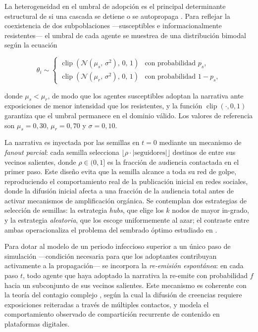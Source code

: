 \medskip

La heterogeneidad en el umbral de adopción es el principal determinante estructural de si una cascada se detiene o se autopropaga \cite{Granovetter1978, Watts2002}. Para reflejar la coexistencia de dos subpoblaciones ---susceptibles e informacionalmente resistentes--- el umbral de cada agente se muestrea de una distribución bimodal según la ecuación

\begin{equation}
  \label{eq:theta}
  \theta_i \sim
  \begin{cases}
    \operatorname{clip}\!\left(\mathcal{N}(\mu_s,\,\sigma^2),\,0,\,1\right) & \text{con probabilidad } p_s,\\[4pt]
    \operatorname{clip}\!\left(\mathcal{N}(\mu_r,\,\sigma^2),\,0,\,1\right) & \text{con probabilidad } 1 - p_s,
  \end{cases}
\end{equation}

\noindent donde $\mu_s < \mu_r$, de modo que los agentes susceptibles adoptan la narrativa ante exposiciones de menor intensidad que los resistentes, y la función $\operatorname{clip}(\cdot, 0, 1)$ garantiza que el umbral permanece en el dominio válido. Los valores de referencia son $\mu_s = 0{,}30$, $\mu_r = 0{,}70$ y $\sigma = 0{,}10$.

\medskip

La narrativa es inyectada por las semillas en $t = 0$ mediante un mecanismo de \emph{fanout parcial}: cada semilla selecciona $\lfloor \rho \cdot |\text{seguidores}| \rfloor$ destinos de entre sus vecinos salientes, donde $\rho \in (0, 1]$ es la fracción de audiencia contactada en el primer paso. Este diseño evita que la semilla alcance a toda su red de golpe, reproduciendo el comportamiento real de la publicación inicial en redes sociales, donde la difusión inicial afecta a una fracción de la audiencia total antes de activar mecanismos de amplificación orgánica. Se contemplan dos estrategias de selección de semillas: la estrategia \emph{hubs}, que elige los $k$ nodos de mayor in-grado, y la estrategia \emph{aleatoria}, que los escoge uniformemente al azar; el contraste entre ambas operacionaliza el problema del sembrado óptimo estudiado en \cite{KempeKleinbergTardos2003}.

\medskip

Para dotar al modelo de un periodo infeccioso superior a un único paso de simulación ---condición necesaria para que los adoptantes contribuyan activamente a la propagación--- se incorpora la \emph{re-emisión espontánea}: en cada paso $t$, todo agente que haya adoptado la narrativa la re-emite con probabilidad $f$ hacia un subconjunto de sus vecinos salientes. Este mecanismo es coherente con la teoría del contagio complejo \cite{CentolaMacy2007}, según la cual la difusión de creencias requiere exposiciones reiteradas a través de múltiples contactos, y modela el comportamiento observado de compartición recurrente de contenido en plataformas digitales.

